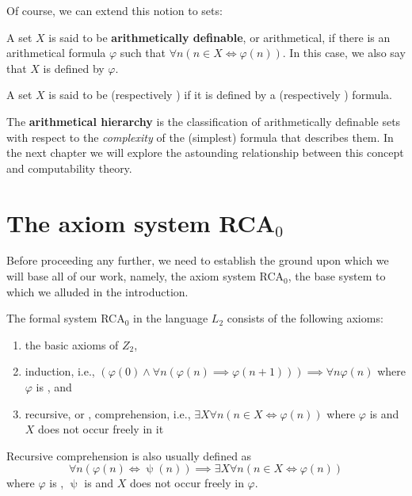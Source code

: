 \documentclass[../main.tex]{memoir}
\begin{document}
Of course, we can extend this notion to sets:

\begin{definition}
  A set $X$ is said to be \textbf{arithmetically definable}, or arithmetical, if there is an arithmetical formula $\varphi$ such that $\forall n (n \in X \iff \varphi(n))$. In this case, we also say that $X$ is defined by $\varphi$.
\end{definition}

\begin{definition}
  A set $X$ is said to be  (respectively ) if it is defined by a  (respectively ) formula.
\end{definition}

The \textbf{arithmetical hierarchy} is the classification of arithmetically definable sets with respect to the \textit{complexity} of the (simplest) formula that describes them. In the next chapter we will explore the astounding relationship between this concept and computability theory.

\section{The axiom system RCA$_0$}

\label{sec:rca-intro}

Before proceeding any further, we need to establish the ground upon which we will base all of our work, namely, the axiom system RCA$_0$, the base system to which we alluded in the introduction.


\begin{definition}
  \label{def:rca-intro}
  The formal system RCA$_0$ in the language $L_2$ consists of the following axioms:

  \begin{enumerate}
  \item the basic axioms of $Z_2$,
  \item \re  induction, i.e., $(\varphi(0) \land \forall n (\varphi(n) \implies \varphi(n + 1))) \implies \forall n \varphi(n)$ where $\varphi$ is \re, and
  \item recursive, or \rec, comprehension, i.e., $\exists X \forall n (n \in X \iff \varphi(n))$ where $\varphi$ is \rec and $X$ does not occur freely in it
  \end{enumerate}
\end{definition}

Recursive comprehension is also usually defined as
\[
  \forall n (\varphi(n) \iff \uppsi(n)) \implies \exists X \forall n (n \in X \iff \varphi(n))
\]
where $\varphi$ is \re, $\uppsi$ is \core and $X$ does not occur freely in $\varphi$. \\
\end{document}
